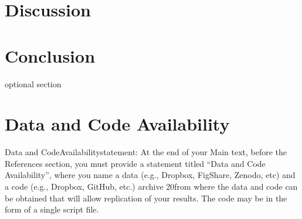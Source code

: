 \documentclass[11pt, a4paper, titlepage]{article}
\begin{document}
    \clearpage
    
     \section*{Discussion}
     
     \clearpage
     
     \section*{Conclusion }
     optional section
     \clearpage
    
    \section*{Data and Code Availability}
    Data  and  CodeAvailabilitystatement:  At  the  end  of  your  Main  text,  before  the  References section, you must provide a statement titled “Data and Code Availability”, where you name a data (e.g., Dropbox, FigShare, Zenodo, etc) and a code (e.g., Dropbox, GitHub, etc.) archive 
    20from where the data and code can be obtained that will allow replication of your results. The code may be in the form of a single script file.
    
    \clearpage
    

    
\end{document}
